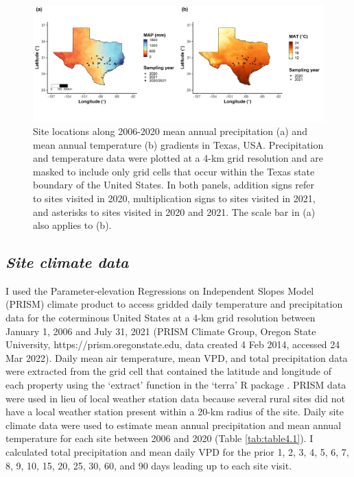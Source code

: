 \newpage
\begin{landscape}
    \begin{figure}
        \centering
        \includegraphics[scale = 0.049]{ch4_TXeco/figs/TXeco_fig1_site_map.png}
        \caption[Site locations along 2006-2020 mean annual precipitation and mean annual temperature gradients in Texas, USA.]{Site locations along 2006-2020 mean annual precipitation (a) and mean annual temperature (b) gradients in Texas, USA. Precipitation and temperature data were plotted at a 4-km grid resolution and are masked to include only grid cells that occur within the Texas state boundary of the United States. In both panels, addition signs refer to sites visited in 2020, multiplication signs to sites visited in 2021, and asterisks to sites visited in 2020 and 2021. The scale bar in (a) also applies to (b).}
        \label{fig:figure4.1}
    \end{figure}
\end{landscape}
\clearpage

\subsection{\textit{Site climate data}}
\noindent I used the Parameter-elevation Regressions on Independent Slopes Model (PRISM)  climate product to access gridded daily temperature and precipitation data for the coterminous United States at a 4-km grid resolution between January 1, 2006 and July 31, 2021 (PRISM Climate Group, Oregon State University, https://prism.oregonstate.edu, data created 4 Feb 2014, accessed 24 Mar 2022). Daily mean air temperature, mean VPD, and total precipitation data were extracted from the grid cell that contained the latitude and longitude of each property using the ‘extract’ function in the ‘terra’ R package . PRISM data were used in lieu of local weather station data because several rural sites did not have a local weather station present within a 20-km radius of the site. Daily site climate data were used to estimate mean annual precipitation and mean annual temperature for each site between 2006 and 2020 (Table \ref{tab:table4.1}). I calculated total precipitation and mean daily VPD for the prior 1, 2, 3, 4, 5, 6, 7, 8, 9, 10, 15, 20, 25, 30, 60, and 90 days leading up to each site visit.

